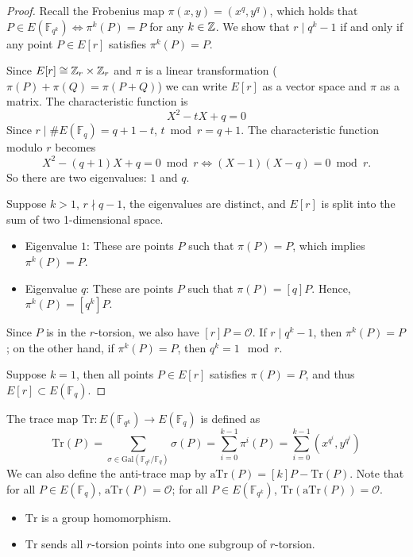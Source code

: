 \begin{proof}

Recall the Frobenius map $\pi(x, y) = (x^q, y^q)$, which holds that $P \in E(\mathbb{F}_{q^k}) \Leftrightarrow \pi^k(P) = P$ for any $k\in \mathbb{Z}$. We show that $r \mid q^k -1$ if and only if any point $P \in E[r]$ satisfies $\pi^k(P) =P$.

Since $E[r] \cong \mathbb{Z}_r \times \mathbb{Z}_r$ and $\pi$ is a linear transformation ($\pi(P) + \pi(Q) = \pi(P + Q)$) we can write $E[r]$ as a vector space and $\pi$ as a matrix. The characteristic function is
\[
	X^2 - t X + q = 0
\]
Since $r \mid \#E(\mathbb{F}_q) = q + 1 - t$, $t \bmod r = q+1$. The characteristic function modulo $r$ becomes
\[
	X^2 - (q+1)X + q = 0 \bmod r \Longleftrightarrow (X-1)(X-q) = 0 \bmod r.
\]
So there are two eigenvalues: $1$ and $q$.

Suppose $k > 1$, $r \nmid q-1$, the eigenvalues are distinct, and $E[r]$ is split into the sum of two 1-dimensional space.
\begin{itemize}
	\item Eigenvalue $1$: These are points $P$ such that $\pi(P) = P$, which implies $\pi^k(P) = P$.
	\item Eigenvalue $q$: These are points $P$ such that $\pi(P) = [q] P$. Hence, $\pi^k(P) = [q^k]P$.
\end{itemize}
Since $P$ is in the $r$-torsion, we also have $[r] P = \mathcal{O}$. If $r \mid q^k - 1$, then $\pi^k(P) = P$; on the other hand, if $\pi^k(P) = P$, then $q^k = 1 \mod r$.

Suppose $k = 1$, then all points $P \in E[r]$ satisfies $\pi(P) = P$, and thus $E[r] \subset E(\mathbb{F}_q)$. 

\end{proof}

\begin{definition}
The trace map $\text{Tr}: E(\mathbb{F}_{q^k}) \to E(\mathbb{F}_q)$ is defined as
\[
	\text{Tr}(P) = \sum_{\sigma \in \text{Gal}(\mathbb{F}_{q^k}/\mathbb{F}_q)} \sigma(P) = \sum_{i=0}^{k-1}\pi^i(P) = \sum_{i=0}^{k-1}(x^{q^i}, y^{q^i})\]
We can also define the anti-trace map by $\text{aTr}(P) = [k]P - \text{Tr}(P)$. Note that for all $P \in E(\mathbb{F}_q)$, $\text{aTr}(P) = \mathcal{O}$; for all $P \in E(\mathbb{F}_{q^k})$, $\text{Tr}(\text{aTr}(P)) = \mathcal{O}$.
\end{definition}

\begin{proposition}
\leavevmode
\begin{itemize}
	\item $\text{Tr}$ is a group homomorphism.
	\item $\text{Tr}$ sends all $r$-torsion points into one subgroup of $r$-torsion.
\end{itemize}

\end{proposition}

